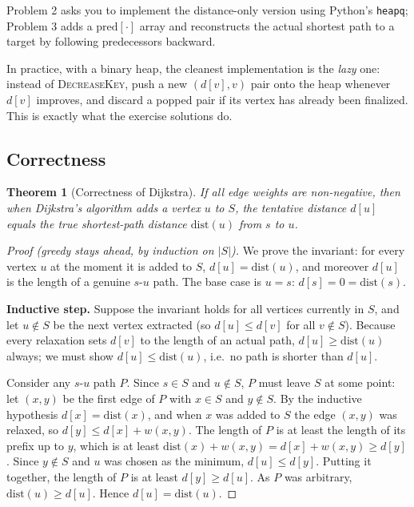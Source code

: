 \documentclass[11pt]{article}
\newtheorem{theorem}{Theorem}[section]
\begin{document}
Problem 2 asks you to implement the distance-only version using Python's
\texttt{heapq}; Problem 3 adds a $\mathrm{pred}[\cdot]$ array and reconstructs
the actual shortest path to a target by following predecessors backward.

In practice, with a binary heap, the cleanest implementation is the \emph{lazy}
one: instead of \textsc{DecreaseKey}, push a new $(d[v], v)$ pair onto the heap
whenever $d[v]$ improves, and discard a popped pair if its vertex has already
been finalized. This is exactly what the exercise solutions do.

\subsection{Correctness}

\begin{theorem}[Correctness of Dijkstra]
\label{thm:dijkstra}
If all edge weights are non-negative, then when Dijkstra's algorithm adds a
vertex $u$ to $S$, the tentative distance $d[u]$ equals the true shortest-path
distance $\mathrm{dist}(u)$ from $s$ to $u$.
\end{theorem}

\begin{proof}[Proof (greedy stays ahead, by induction on $|S|$)]
We prove the invariant: for every vertex $u$ at the moment it is added to $S$,
$d[u] = \mathrm{dist}(u)$, and moreover $d[u]$ is the length of a genuine
$s$-$u$ path. The base case is $u = s$: $d[s] = 0 = \mathrm{dist}(s)$.

\textbf{Inductive step.} Suppose the invariant holds for all vertices currently
in $S$, and let $u \notin S$ be the next vertex extracted (so $d[u] \le d[v]$
for all $v \notin S$). Because every relaxation sets $d[v]$ to the length of an
actual path, $d[u] \ge \mathrm{dist}(u)$ always; we must show $d[u] \le
\mathrm{dist}(u)$, i.e.\ no path is shorter than $d[u]$.

Consider any $s$-$u$ path $P$. Since $s \in S$ and $u \notin S$, $P$ must leave
$S$ at some point: let $(x,y)$ be the first edge of $P$ with $x \in S$ and $y
\notin S$. By the inductive hypothesis $d[x] = \mathrm{dist}(x)$, and when $x$
was added to $S$ the edge $(x,y)$ was relaxed, so $d[y] \le d[x] + w(x,y)$. The
length of $P$ is at least the length of its prefix up to $y$, which is at least
$\mathrm{dist}(x) + w(x,y) = d[x] + w(x,y) \ge d[y]$. Since $y \notin S$ and $u$
was chosen as the minimum, $d[u] \le d[y]$. Putting it together, the length of
$P$ is at least $d[y] \ge d[u]$. As $P$ was arbitrary, $\mathrm{dist}(u) \ge
d[u]$. Hence $d[u] = \mathrm{dist}(u)$.
\end{proof}
\end{document}
